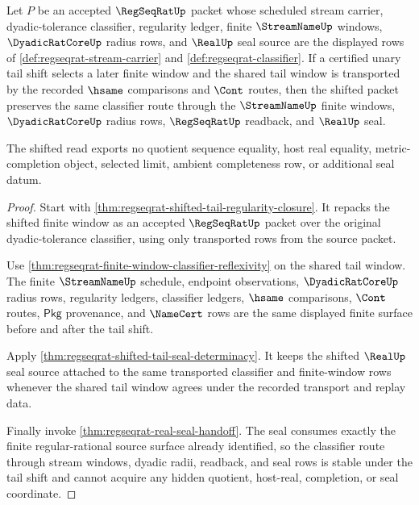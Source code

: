 \begin{theorem}
\label{thm:regseqrat-tail-shift-classifier-stability}
Let $P$ be an accepted $\RegSeqRatUp$ packet whose scheduled stream carrier, dyadic-tolerance classifier, regularity ledger, finite $\StreamNameUp$ windows, $\DyadicRatCoreUp$ radius rows, and $\RealUp$ seal source are the displayed rows of \autoref{def:regseqrat-stream-carrier} and \autoref{def:regseqrat-classifier}. If a certified unary tail shift selects a later finite window and the shared tail window is transported by the recorded $\hsame$ comparisons and $\Cont$ routes, then the shifted packet preserves the same classifier route through the $\StreamNameUp$ finite windows, $\DyadicRatCoreUp$ radius rows, $\RegSeqRatUp$ readback, and $\RealUp$ seal.

The shifted read exports no quotient sequence equality, host real equality, metric-completion object, selected limit, ambient completeness row, or additional seal datum.
\end{theorem}
\begin{proof}
Start with \autoref{thm:regseqrat-shifted-tail-regularity-closure}. It repacks the shifted finite window as an accepted $\RegSeqRatUp$ packet over the original dyadic-tolerance classifier, using only transported rows from the source packet.

Use \autoref{thm:regseqrat-finite-window-classifier-reflexivity} on the shared tail window. The finite $\StreamNameUp$ schedule, endpoint observations, $\DyadicRatCoreUp$ radius rows, regularity ledgers, classifier ledgers, $\hsame$ comparisons, $\Cont$ routes, $\mathsf{Pkg}$ provenance, and $\NameCert$ rows are the same displayed finite surface before and after the tail shift.

Apply \autoref{thm:regseqrat-shifted-tail-seal-determinacy}. It keeps the shifted $\RealUp$ seal source attached to the same transported classifier and finite-window rows whenever the shared tail window agrees under the recorded transport and replay data.

Finally invoke \autoref{thm:regseqrat-real-seal-handoff}. The seal consumes exactly the finite regular-rational source surface already identified, so the classifier route through stream windows, dyadic radii, readback, and seal rows is stable under the tail shift and cannot acquire any hidden quotient, host-real, completion, or seal coordinate.
\end{proof}

